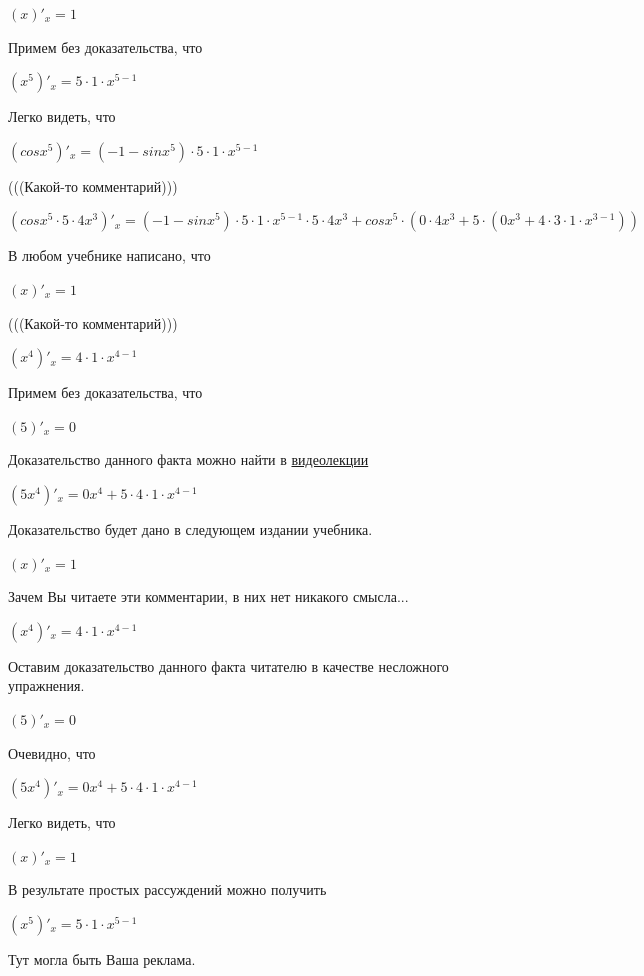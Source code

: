 \documentclass[12pt,a4paper,fleqn]{article}
\theoremstyle{definition}
\begin{document}
$( x )'_{x} =  1 $

Примем без доказательства, что 

$({ x }^{ 5 })'_{x} =  5  \cdot  1  \cdot { x }^{ 5  -  1 }$

Легко видеть, что 

$(cos{ x }^{ 5 })'_{x} = ( -1  - sin{ x }^{ 5 }) \cdot  5  \cdot  1  \cdot { x }^{ 5  -  1 }$

(((Какой-то комментарий))) 

$(cos{ x }^{ 5 } \cdot  5  \cdot  4 { x }^{ 3 })'_{x} = ( -1  - sin{ x }^{ 5 }) \cdot  5  \cdot  1  \cdot { x }^{ 5  -  1 } \cdot  5  \cdot  4 { x }^{ 3 } + cos{ x }^{ 5 } \cdot ( 0  \cdot  4 { x }^{ 3 } +  5  \cdot ( 0 { x }^{ 3 } +  4  \cdot  3  \cdot  1  \cdot { x }^{ 3  -  1 }))$

В любом учебнике написано, что 

$( x )'_{x} =  1 $

(((Какой-то комментарий))) 

$({ x }^{ 4 })'_{x} =  4  \cdot  1  \cdot { x }^{ 4  -  1 }$

Примем без доказательства, что 

$( 5 )'_{x} =  0 $

Доказательство данного факта можно найти в \href{https://www.youtube.com/watch?v=dQw4w9WgXcQ}{видеолекции} 

$( 5 { x }^{ 4 })'_{x} =  0 { x }^{ 4 } +  5  \cdot  4  \cdot  1  \cdot { x }^{ 4  -  1 }$

Доказательство будет дано в следующем издании учебника. 

$( x )'_{x} =  1 $

Зачем Вы читаете эти комментарии, в них нет никакого смысла... 

$({ x }^{ 4 })'_{x} =  4  \cdot  1  \cdot { x }^{ 4  -  1 }$

Оставим доказательство данного факта читателю в качестве несложного упражнения. 

$( 5 )'_{x} =  0 $

Очевидно, что 

$( 5 { x }^{ 4 })'_{x} =  0 { x }^{ 4 } +  5  \cdot  4  \cdot  1  \cdot { x }^{ 4  -  1 }$

Легко видеть, что 

$( x )'_{x} =  1 $

В результате простых рассуждений можно получить 

$({ x }^{ 5 })'_{x} =  5  \cdot  1  \cdot { x }^{ 5  -  1 }$

Тут могла быть Ваша реклама. 
\end{document}
